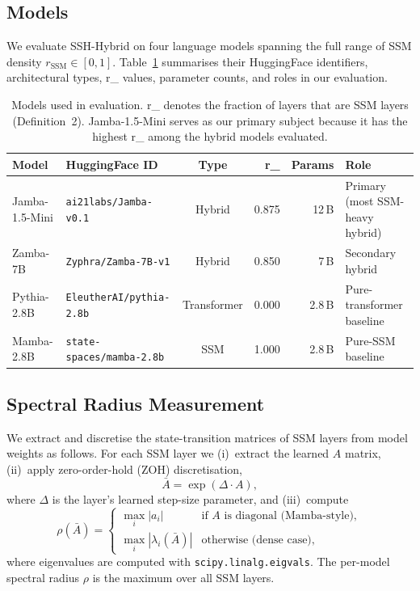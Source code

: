 \documentclass{article}
\newcommand{\rSSM}{r_{\mathrm{SSM}}}
\begin{document}
\subsection{Models}
\label{sec:models}

We evaluate SSH-Hybrid on four language models spanning the full range of SSM density
$\rSSM \in [0, 1]$.
Table~\ref{tab:models} summarises their HuggingFace identifiers, architectural types,
\rSSM{} values, parameter counts, and roles in our evaluation.

\begin{table}[ht]
  \centering
  \caption{Models used in evaluation. \rSSM{} denotes the fraction of layers that are SSM
           layers (Definition~2). Jamba-1.5-Mini serves as our primary subject because it has
           the highest \rSSM{} among the hybrid models evaluated.}
  \label{tab:models}
  \begin{tabular}{llcrrp{3.5cm}}
    \toprule
    \textbf{Model} & \textbf{HuggingFace ID} & \textbf{Type} &
      \rSSM{} & \textbf{Params} & \textbf{Role} \\
    \midrule
    Jamba-1.5-Mini & \texttt{ai21labs/Jamba-v0.1}       & Hybrid      & 0.875 & 12\,B  & Primary (most SSM-heavy hybrid) \\
    Zamba-7B       & \texttt{Zyphra/Zamba-7B-v1}        & Hybrid      & 0.850 &  7\,B  & Secondary hybrid \\
    Pythia-2.8B    & \texttt{EleutherAI/pythia-2.8b}    & Transformer & 0.000 & 2.8\,B & Pure-transformer baseline \\
    Mamba-2.8B     & \texttt{state-spaces/mamba-2.8b}   & SSM         & 1.000 & 2.8\,B & Pure-SSM baseline \\
    \bottomrule
  \end{tabular}
\end{table}

\subsection{Spectral Radius Measurement}
\label{sec:spectral-measurement}

We extract and discretise the state-transition matrices of SSM layers from model weights
as follows.
For each SSM layer we (i)~extract the learned $A$ matrix, (ii)~apply zero-order-hold (ZOH)
discretisation,
\begin{equation}
  \bar{A} = \exp(\Delta \cdot A),
  \label{eq:zoh}
\end{equation}
where $\Delta$ is the layer's learned step-size parameter, and (iii)~compute
\begin{equation}
  \rho(\bar{A}) =
  \begin{cases}
    \max_{i}|a_i|              & \text{if } A \text{ is diagonal (Mamba-style)}, \\
    \max_{i}|\lambda_i(\bar{A})| & \text{otherwise (dense case),}
  \end{cases}
  \label{eq:spectral-radius}
\end{equation}
where eigenvalues are computed with \texttt{scipy.linalg.eigvals}.
The per-model spectral radius $\rho$ is the maximum over all SSM layers.
\end{document}
